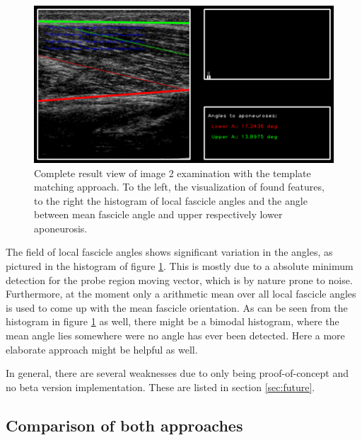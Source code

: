 \documentclass[10pt,twocolumn,letterpaper]{article}
\begin{document}
\begin{figure}
	\begin{center}		
		\includegraphics[width=\linewidth]{img/im2_resView_tm}
		
	\end{center}
	\caption{Complete result view of image 2 examination with the template matching approach. To the left, the visualization of found features, to the right the histogram of local fascicle angles and the angle between mean fascicle angle and upper respectively lower aponeurosis.}
	\label{fig:im2_results}
\end{figure}

The field of local fascicle angles shows significant variation in the angles, as pictured in the histogram of figure \ref{fig:im2_results}. This is mostly due to a absolute minimum detection for the probe region moving vector, which is by nature prone to noise. Furthermore, at the moment only a arithmetic mean over all local fascicle angles is used to come up with the mean fascicle orientation. As can be seen from the histogram in figure \ref{fig:im2_results} as well, there might be a bimodal histogram, where the mean angle lies somewhere were no angle has ever been detected. Here a more elaborate approach might be helpful as well.

In general, there are several weaknesses due to only being proof-of-concept and no beta version implementation. These are listed in section \ref{sec:future}.

\subsection{Comparison of both approaches}
\end{document}
